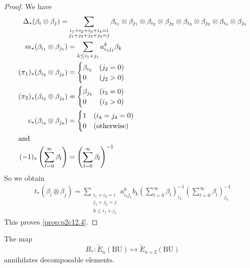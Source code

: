 \documentclass[../main]{subfiles}
\begin{document}
\begin{proof}
We have
\begin{align*}
\Delta_\ast(\beta_i\otimes\beta_j) = &\sum_{\substack{i_1+i_2+i_3+i_4=i\\ j_1+j_2+j_3+j_4=j}} \beta_{i_1}\otimes\beta_{j_1}\otimes\beta_{i_2}\otimes\beta_{j_2}\otimes\beta_{i_3}\otimes\beta_{j_3}\otimes\beta_{i_4}\otimes\beta_{j_4}\\
m_\ast(\beta_{i_1}\otimes\beta_{j_1})&= \sum_{k\le i_1+j_1}a^k_{{i_1}{j_1}}\beta_k\\
(\pi_1)_\ast(\beta_{i_2}\otimes\beta_{j_2}) &= \begin{cases}\beta_{i_2}&(j_2=0)\\0&(j_2>0)\end{cases}\\
(\pi_2)_\ast(\beta_{i_3}\otimes\beta_{j_3}) &= \begin{cases}\beta_{j_3}&(i_3=0)\\0&(i_3>0)\end{cases}\\
c_\ast(\beta_{i_4}\otimes\beta_{j_4}) &= \begin{cases}1 & (i_4=j_4=0)\\0&(\text{otherwise})\end{cases}\\
\intertext{and}
(-1)_\ast\left(\sum^\infty_{l=0} \beta_l\right) &= \left(\sum^\infty_{l=0} \beta_l\right)^{-1}
\end{align*}
So we obtain
\begin{align*}
t_\ast(\beta_{i}\otimes\beta_{j}) = \sum_{\substack{i_1+i_2=i\\ j_1+j_3=j\\k\le i_1+j_1}} a^k_{{i_1}{j_1}} b_k \left(\sum^\infty_{l=0}\beta_l\right)_{i_2}^{-1} \left(\sum^\infty_{l=0} \beta_l\right)^{-1}_{j_3}
\end{align*}
This proves \eqref{prop:p2c12.4}.
\end{proof}
\begin{proposition}
\label{prop:p2c12.5}
The map $$B_\ast:\widetilde{E}_n(\mathrm{BU}) \mapsto \widetilde{E}_{n+2}(\mathrm{BU})$$ annihilates decomposable elements. 
\end{proposition}
\end{document}
